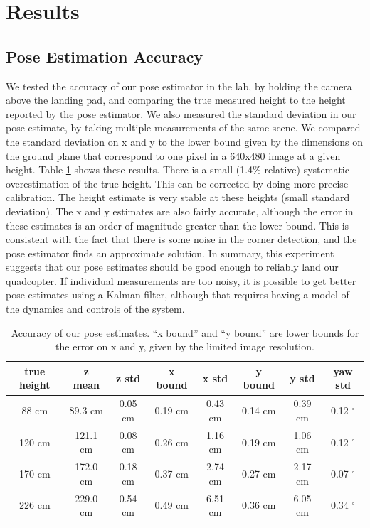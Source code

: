 \documentclass[10pt]{scrartcl} %
\begin{document}
\section{Results}

\subsection{Pose Estimation Accuracy}
\label{sec:accuracy}

We tested the accuracy of our pose estimator in the lab, by holding the camera
above the landing pad, and comparing the true measured height to the height
reported by the pose estimator. We also measured the standard deviation in our
pose estimate, by taking multiple measurements of the same scene. We compared
the standard deviation on x and y to the lower bound given by the dimensions on
the ground plane that correspond to one pixel in a 640x480 image at a given
height. Table \ref{tab:pose-accu} shows these results. There is a small (1.4\%
relative) systematic overestimation of the true height. This can be corrected
by doing more precise calibration. The height estimate is very stable at these
heights (small standard deviation). The x and y estimates are also fairly
accurate, although the error in these estimates is an order of magnitude
greater than the lower bound. This is consistent with the fact that there is
some noise in the corner detection, and the pose estimator finds an approximate
solution. In summary, this experiment suggests that our pose estimates should
be good enough to reliably land our quadcopter. If individual measurements are
too noisy, it is possible to get better pose estimates using a Kalman filter,
although that requires having a model of the dynamics and controls of the
system.

\begin{table}[h!]
    \centering
    \begin{tabular}{c|cc|cc|cc|c}
        true height & z mean    & z std     & x bound   & x std     & y bound   & y std     & yaw std \\
        \hline
         88 cm      & 89.3 cm   & 0.05 cm   & 0.19 cm   & 0.43 cm   & 0.14 cm   & 0.39 cm   & 0.12 $^{\circ}$ \\
        120 cm      & 121.1 cm  & 0.08 cm   & 0.26 cm   & 1.16 cm   & 0.19 cm   & 1.06 cm   & 0.12 $^{\circ}$ \\
        170 cm      & 172.0 cm  & 0.18 cm   & 0.37 cm   & 2.74 cm   & 0.27 cm   & 2.17 cm   & 0.07 $^{\circ}$ \\
        226 cm      & 229.0 cm  & 0.54 cm   & 0.49 cm   & 6.51 cm   & 0.36 cm   & 6.05 cm   & 0.34 $^{\circ}$ \\
    \end{tabular}
    \caption{
        Accuracy of our pose estimates. ``x bound'' and ``y bound'' are lower
        bounds for the error on x and y, given by the limited image resolution.
    }
    \label{tab:pose-accu}
\end{table}
\end{document}
